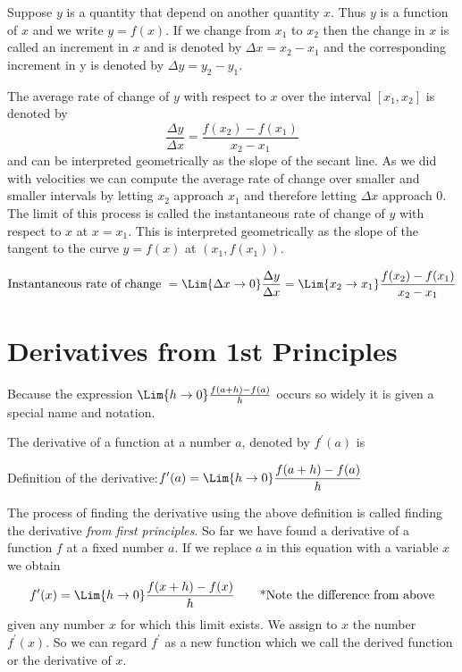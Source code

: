 Suppose $y$ is a quantity that depend on another quantity $x$. Thus $y$ is a function of $x$ and we write $y =f (x)$. If we change from $x_{1}$ to $x_{2}$ then the change in $x$ is called an increment in $x$ and is denoted by $ \Delta x =x_{2} -x_{1}$ and the corresponding increment in y is denoted by $ \Delta y =y_{2} -y_{1}$. 

The average rate of change of $y$ with respect to $x$ over the interval $\left [x_{1} ,x_{2}\right ]$ is denoted by 
$$\frac{ \Delta y}{ \Delta x} =\frac{f (x_{2}) -f (x_{1})}{x_{2} -x_{1}}$$
and can be interpreted geometrically as the slope of the secant line. As we did with velocities we can compute the average rate of change over smaller and smaller intervals by letting $x_{2}$ approach $x_{1}$ and therefore letting $ \Delta x$ approach $0$. The limit of this process is called the instantaneous rate of change of $y$ with respect to $x$ at $x =x_{1}$. This is interpreted geometrically as the slope of the tangent to the curve $y =f (x)$ at $(x_{1} ,f (x_{1}))$. 

\begin{tcolorbox}
$$\text{Instantaneous rate of change }=\Lim{\Delta x \to 0} \frac{ \Delta y}{ \Delta x} =\Lim{x_2 \to x_1}\frac{f (x_{2}) -f (x_{1})}{x_{2} -x_{1}}$$
\end{tcolorbox}

\section{Derivatives from 1st Principles}
Because the expression $\Lim{h \to 0}\frac{f (a +h) -f (a)}{h}$ occurs so widely it is given a special name and notation. 

The derivative of a function at a number $a$, denoted by $f^{ \prime } (a)$ is 
\begin{tcolorbox}
Definition of the derivative:\qquad$\displaystyle f^{ \prime } (a) =\Lim{h \to 0}\frac{f (a +h) -f (a)}{h}$
\end{tcolorbox}

The process of finding the derivative using the above definition is called finding the derivative \textit{from first principles}. So far we have found a derivative of a function $f$ at a fixed number $a$. If we replace $a$ in this equation with a variable $x$ we obtain 
\[f^{ \prime } (x) =\Lim{h \to 0}\frac{f (x +h) -f (x)}{h}\tag*{*Note the difference from above}\]
given any number $x$ for which this limit exists. We assign to $x$ the number $f^{ \prime } \left (x\right )$. So we can regard $f^{ \prime }$ as a new function which we call the derived function or the derivative of $x$. 

